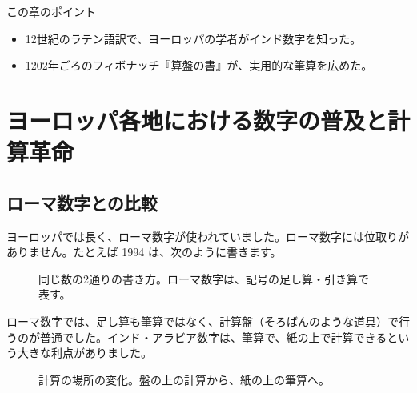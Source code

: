 \documentclass[a4paper,11pt,openany]{ltjsbook}
\begin{document}
\begin{pointbox}{この章のポイント}
\begin{itemize}[leftmargin=1.5em]
\item 12世紀のラテン語訳で、ヨーロッパの学者がインド数字を知った。
\item 1202年ごろのフィボナッチ『算盤の書』が、実用的な筆算を広めた。
\end{itemize}
\end{pointbox}

\chapter{ヨーロッパ各地における数字の普及と計算革命}

\section{ローマ数字との比較}

ヨーロッパでは長く、ローマ数字が使われていました。ローマ数字には位取りがありません。たとえば 1994 は、次のように書きます。

\begin{figure}[htbp]
\centering
{}
\caption{同じ数の2通りの書き方。ローマ数字は、記号の足し算・引き算で表す。}
\end{figure}

ローマ数字では、足し算も筆算ではなく、計算盤（そろばんのような道具）で行うのが普通でした。インド・アラビア数字は、筆算で、紙の上で計算できるという大きな利点がありました。

\begin{figure}[htbp]
\centering
{}
\caption{計算の場所の変化。盤の上の計算から、紙の上の筆算へ。}
\end{figure}
\end{document}
